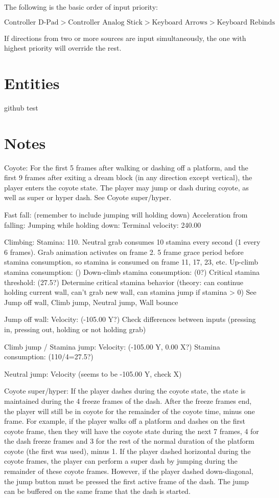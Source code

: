 \documentclass[oneside]{book}
\begin{document}
The following is the basic order of input priority:

$$\text{Controller D-Pad} > \text{Controller Analog Stick} > \text{Keyboard Arrows} > \text{Keyboard Rebinds}$$

If directions from two or more sources are input simultaneously, the one with highest priority will override the rest.

\chapter{Entities}

github test

\chapter{Notes}



Coyote:
For the first 5 frames after walking or dashing off a platform, and the first 9 frames after exiting a dream block (in any direction except vertical), the player enters the coyote state. The player may jump or dash during coyote, as well as super or hyper dash. See Coyote super/hyper.

Fast fall: (remember to include jumping will holding down)
Acceleration from falling:
Jumping while holding down:
Terminal velocity: 240.00



Climbing:
Stamina: 110. Neutral grab consumes 10 stamina every second (1 every 6 frames). Grab animation activates on frame 2. 5 frame grace period before stamina consumption, so stamina is consumed on frame 11, 17, 23, etc.
Up-climb stamina consumption: ()
Down-climb stamina consumption: (0?)
Critical stamina threshold: (27.5?)
Determine critical stamina behavior (theory: can continue holding current wall, can't grab new wall, can stamina jump if stamina > 0)
See Jump off wall, Climb jump, Neutral jump, Wall bounce

Jump off wall:
Velocity: (-105.00 Y?)
Check differences between inputs (pressing in, pressing out, holding or not holding grab)

Climb jump / Stamina jump:
Velocity: (-105.00 Y, 0.00 X?)
Stamina consumption: (110/4=27.5?)

Neutral jump:
Velocity (seems to be -105.00 Y, check X)

Coyote super/hyper:
If the player dashes during the coyote state, the state is maintained during the 4 freeze frames of the dash. After the freeze frames end, the player will still be in coyote for the remainder of the coyote time, minus one frame. For example, if the player walks off a platform and dashes on the first coyote frame, then they will have the coyote state during the next 7 frames, 4 for the dash freeze frames and 3 for the rest of the normal duration of the platform coyote (the first was used), minus 1. If the player dashed horizontal during the coyote frames, the player can perform a super dash by jumping during the remainder of these coyote frames. However, if the player dashed down-diagonal, the jump button must be pressed the first active frame of the dash. The jump can be buffered on the same frame that the dash is started.
\end{document}
